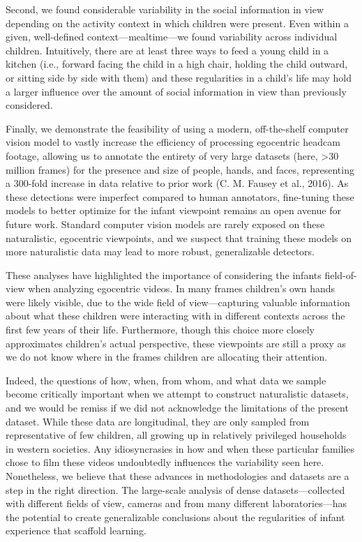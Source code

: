 \documentclass[10pt, letterpaper]{article}
\begin{document}
Second, we found considerable variability in the social information in
view depending on the activity context in which children were present.
Even within a given, well-defined context---mealtime---we found
variability across individual children. Intuitively, there are at least
three ways to feed a young child in a kitchen (i.e., forward facing the
child in a high chair, holding the child outward, or sitting side by
side with them) and these regularities in a child's life may hold a
larger influence over the amount of social information in view than
previously considered.

Finally, we demonstrate the feasibility of using a modern, off-the-shelf
computer vision model to vastly increase the efficiency of processing
egocentric headcam footage, allowing us to annotate the entirety of very
large datasets (here, \textgreater{}30 million frames) for the presence
and size of people, hands, and faces, representing a 300-fold increase
in data relative to prior work (C. M. Fausey et al., 2016). As these
detections were imperfect compared to human annotators, fine-tuning
these models to better optimize for the infant viewpoint remains an open
avenue for future work. Standard computer vision models are rarely
exposed on these naturalistic, egocentric viewpoints, and we suspect
that training these models on more naturalistic data may lead to more
robust, generalizable detectors.

These analyses have highlighted the importance of considering the
infants field-of-view when analyzing egocentric videos. In many frames
children's own hands were likely visible, due to the wide field of
view---capturing valuable information about what these children were
interacting with in different contexts across the first few years of
their life. Furthermore, though this choice more closely approximates
children's actual perspective, these viewpoints are still a proxy as we
do not know where in the frames children are allocating their attention.

Indeed, the questions of how, when, from whom, and what data we sample
become critically important when we attempt to construct naturalistic
datasets, and we would be remiss if we did not acknowledge the
limitations of the present dataset. While these data are longitudinal,
they are only sampled from representative of few children, all growing
up in relatively privileged households in western societies. Any
idiosyncrasies in how and when these particular families chose to film
these videos undoubtedly influences the variability seen here.
Nonetheless, we believe that these advances in methodologies and
datasets are a step in the right direction. The large-scale analysis of
dense datasets---collected with different fields of view, cameras and
from many different laboratories---has the potential to create
generalizable conclusions about the regularities of infant experience
that scaffold learning.
\end{document}
